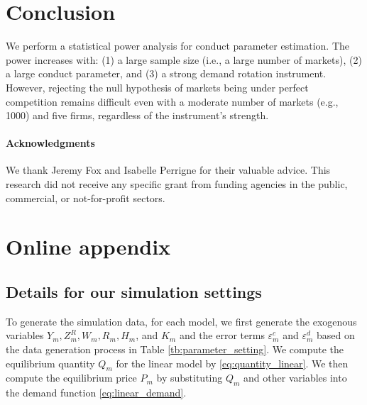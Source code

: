 \documentclass[11pt, a4paper]{article}
\begin{document}
\section{Conclusion}

We perform a statistical power analysis for conduct parameter estimation. The power increases with: (1) a large sample size (i.e., a large number of markets), (2) a large conduct parameter, and (3) a strong demand rotation instrument. However, rejecting the null hypothesis of markets being under perfect competition remains difficult even with a moderate number of markets (e.g., 1000) and five firms, regardless of the instrument's strength.


\paragraph{Acknowledgments}
We thank Jeremy Fox and Isabelle Perrigne for their valuable advice. This research did not receive any specific grant from funding agencies in the public, commercial, or not-for-profit sectors. 

\newpage





\newpage

\setcounter{page}{1}
\appendix
\section{Online appendix}\label{sec:appendix}




\subsection{Details for our simulation settings}

To generate the simulation data, for each model, we first generate the exogenous variables $Y_m, Z^{R}_{m}, W_m, R_{m}, H_m$, and $K_m$ and the error terms $\varepsilon_{m}^c$ and $\varepsilon_{m}^d$ based on the data generation process in Table \ref{tb:parameter_setting}.
We compute the equilibrium quantity $Q_{m}$ for the linear model by \eqref{eq:quantity_linear}.
We then compute the equilibrium price $P_m$ by substituting $Q_{m}$ and other variables into the demand function \eqref{eq:linear_demand}.
\end{document}
